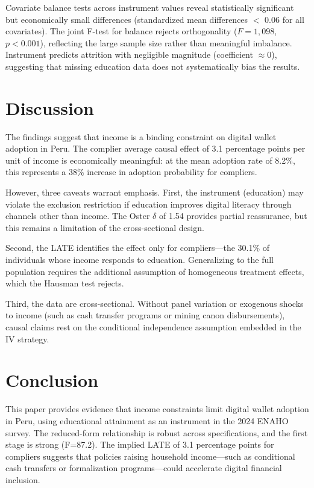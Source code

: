 \documentclass[12pt,a4paper]{article}
\begin{document}


Covariate balance tests across instrument values reveal statistically
significant but economically small differences (standardized mean differences
$<$ 0.06 for all covariates). The joint F-test for balance rejects orthogonality
($F = 1,098$, $p < 0.001$), reflecting the large sample size rather than
meaningful imbalance. Instrument predicts attrition with negligible magnitude
(coefficient $\approx 0$), suggesting that missing education data does not
systematically bias the results.

\section{Discussion}
\label{sec:discussion}

The findings suggest that income is a binding constraint on digital wallet
adoption in Peru. The complier average causal effect of 3.1 percentage points
per unit of income is economically meaningful: at the mean adoption rate of
8.2\%, this represents a 38\% increase in adoption probability for compliers.

However, three caveats warrant emphasis. First, the instrument (education) may
violate the exclusion restriction if education improves digital literacy through
channels other than income. The Oster $\delta$ of 1.54 provides partial
reassurance, but this remains a limitation of the cross-sectional design.

Second, the LATE identifies the effect only for compliers---the 30.1\% of
individuals whose income responds to education. Generalizing to the full
population requires the additional assumption of homogeneous treatment effects,
which the Hausman test rejects.

Third, the data are cross-sectional. Without panel variation or exogenous
shocks to income (such as cash transfer programs or mining canon disbursements),
causal claims rest on the conditional independence assumption embedded in the
IV strategy.

\section{Conclusion}
\label{sec:conclusion}

This paper provides evidence that income constraints limit digital wallet
adoption in Peru, using educational attainment as an instrument in the 2024
ENAHO survey. The reduced-form relationship is robust across specifications,
and the first stage is strong (F=87.2). The implied LATE of 3.1 percentage
points for compliers suggests that policies raising household income---such as
conditional cash transfers or formalization programs---could accelerate digital
financial inclusion.
\end{document}

